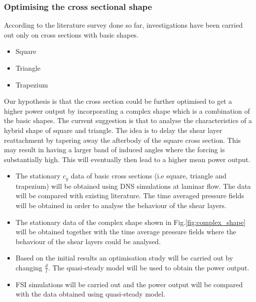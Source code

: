 \documentclass{article}
\begin{document}
\subsubsection{Optimising the cross sectional shape}
According to the literature survey done so far, investigations have been carried out only on cross sections with basic shapes. 

\begin{itemize}
\item{Square}
\item{Triangle}
\item{Trapezium}
\end{itemize}
   
Our hypothesis is that the cross section could be further optimised to get a higher power output by incorporating a complex shape which is a combination of the basic shapes. The current suggestion is that to analyse the characteristics of a hybrid shape of square and triangle. The idea is to delay the shear layer reattachment by tapering away the afterbody of the square cross section. This may result in having a larger band of induced angles where the forcing is substantially high. This will eventually then lead to a higher mean power output.







\begin{itemize}
\item{The stationary $c_y$ data of basic cross sections (i.e square, triangle and trapezium) will be obtained using DNS simulations at laminar flow. The data will be compared with existing literature. The time averaged pressure fields will be obtained in order to analyse the behaviour of the shear layers.}
\item{The stationary data of the complex shape shown in Fig.\ref{fig:complex_shape} will be obtained together with the time average pressure fields where the behaviour of the shear layers could be analysed.}
\item{Based on the initial results an optimisation study will be carried out by changing $\frac{d}{l}$. The quasi-steady model will be used to obtain the power output.}
\item{FSI simulations will be carried out and the power output will be compared with the data obtained using quasi-steady model.}
\end{itemize}  
\end{document}
